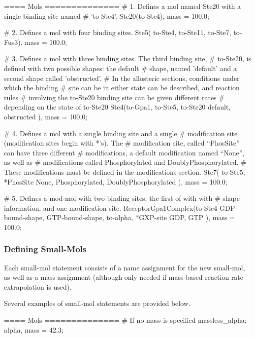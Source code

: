 \begin{ExampleMZR}[label=examplemodmolssec]
==== Mols ==============
    # 1. Defines a mol named Ste20 with a single binding site named
    # 'to-Ste4'. 
    Ste20(to-Ste4),
        mass = 100.0;

    # 2. Defines a mol with four binding sites.
    Ste5( to-Ste4, to-Ste11, to-Ste7, to-Fus3),
         mass = 100.0;

    # 3. Defines a mol with three binding sites.  The third binding site,
    # to-Ste20, is defined with two possible shapes: the default
    # shape, named 'default' and a second shape called 'obstructed'.
    # In the allosteric sections, conditions under which the binding
    # site can be in either state can be described, and reaction rules
    # involving the to-Ste20 binding site can be given different rates
    # depending on the state of to-Ste20
    Ste4(to-Gpa1, to-Ste5, to-Ste20 { default, obstructed} ),
         mass = 100.0;

    # 4. Defines a mol with a single binding site and a single
    # modification site (modification sites begin with *'s). The
    # modification site, called ``PhosSite'' can have three different
    # modifications, a default modification named ``None'', as well as
    # modifications called Phosphorylated and DoublyPhosphorylated.
    # These modifications must be defined in the modifications section.
    Ste7( to-Ste5, *PhosSite { None, Phosphorylated, DoublyPhosphorylated } ),
         mass = 100.0;

    # 5. Defines a mod-mol with two binding sites, the first of with with
    # shape information, and one modification site.
    ReceptorGpa1Complex(to-Ste4 { GDP-bound-shape, GTP-bound-shape},  
                        to-alpha, *GXP-site { GDP, GTP} ), 
   	mass = 100.0;
\end{ExampleMZR}

\subsubsection{Defining Small-Mols}
Each small-mol statement consists of a name assignment for the new
small-mol, as well as a mass assignment (although only needed if
mass-based reaction rate extrapolation is used).  

Several examples of small-mol statements are provided below.  
\begin{ExampleMZR}
  ==== Mols ==============
     # If no mass is specified
     massless_alpha; 
     alpha, mass = 42.3;

\end{ExampleMZR}

